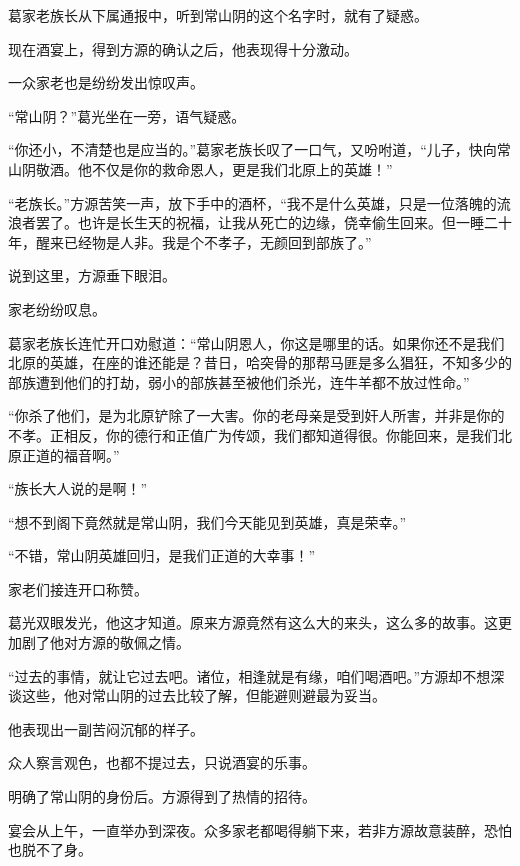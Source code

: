 
\begin{this_body}



葛家老族长从下属通报中，听到常山阴的这个名字时，就有了疑惑。

现在酒宴上，得到方源的确认之后，他表现得十分激动。

一众家老也是纷纷发出惊叹声。

“常山阴？”葛光坐在一旁，语气疑惑。

“你还小，不清楚也是应当的。”葛家老族长叹了一口气，又吩咐道，“儿子，快向常山阴敬酒。他不仅是你的救命恩人，更是我们北原上的英雄！”

“老族长。”方源苦笑一声，放下手中的酒杯，“我不是什么英雄，只是一位落魄的流浪者罢了。也许是长生天的祝福，让我从死亡的边缘，侥幸偷生回来。但一睡二十年，醒来已经物是人非。我是个不孝子，无颜回到部族了。”

说到这里，方源垂下眼泪。

家老纷纷叹息。

葛家老族长连忙开口劝慰道：“常山阴恩人，你这是哪里的话。如果你还不是我们北原的英雄，在座的谁还能是？昔日，哈突骨的那帮马匪是多么猖狂，不知多少的部族遭到他们的打劫，弱小的部族甚至被他们杀光，连牛羊都不放过性命。”

“你杀了他们，是为北原铲除了一大害。你的老母亲是受到奸人所害，并非是你的不孝。正相反，你的德行和正值广为传颂，我们都知道得很。你能回来，是我们北原正道的福音啊。”

“族长大人说的是啊！”

“想不到阁下竟然就是常山阴，我们今天能见到英雄，真是荣幸。”

“不错，常山阴英雄回归，是我们正道的大幸事！”

家老们接连开口称赞。

葛光双眼发光，他这才知道。原来方源竟然有这么大的来头，这么多的故事。这更加剧了他对方源的敬佩之情。

“过去的事情，就让它过去吧。诸位，相逢就是有缘，咱们喝酒吧。”方源却不想深谈这些，他对常山阴的过去比较了解，但能避则避最为妥当。

他表现出一副苦闷沉郁的样子。

众人察言观色，也都不提过去，只说酒宴的乐事。

明确了常山阴的身份后。方源得到了热情的招待。

宴会从上午，一直举办到深夜。众多家老都喝得躺下来，若非方源故意装醉，恐怕也脱不了身。


\end{this_body}
